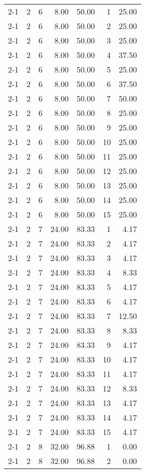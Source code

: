 \begin{tabular}{lrrrrrr}
2-1  & 2 & 6 & 8.00 & 50.00 & 1 & 25.00 \\
2-1  & 2 & 6 & 8.00 & 50.00 & 2 & 25.00 \\
2-1  & 2 & 6 & 8.00 & 50.00 & 3 & 25.00 \\
2-1  & 2 & 6 & 8.00 & 50.00 & 4 & 37.50 \\
2-1  & 2 & 6 & 8.00 & 50.00 & 5 & 25.00 \\
2-1  & 2 & 6 & 8.00 & 50.00 & 6 & 37.50 \\
2-1  & 2 & 6 & 8.00 & 50.00 & 7 & 50.00 \\
2-1  & 2 & 6 & 8.00 & 50.00 & 8 & 25.00 \\
2-1  & 2 & 6 & 8.00 & 50.00 & 9 & 25.00 \\
2-1  & 2 & 6 & 8.00 & 50.00 & 10 & 25.00 \\
2-1  & 2 & 6 & 8.00 & 50.00 & 11 & 25.00 \\
2-1  & 2 & 6 & 8.00 & 50.00 & 12 & 25.00 \\
2-1  & 2 & 6 & 8.00 & 50.00 & 13 & 25.00 \\
2-1  & 2 & 6 & 8.00 & 50.00 & 14 & 25.00 \\
2-1  & 2 & 6 & 8.00 & 50.00 & 15 & 25.00 \\
2-1  & 2 & 7 & 24.00 & 83.33 & 1 & 4.17 \\
2-1  & 2 & 7 & 24.00 & 83.33 & 2 & 4.17 \\
2-1  & 2 & 7 & 24.00 & 83.33 & 3 & 4.17 \\
2-1  & 2 & 7 & 24.00 & 83.33 & 4 & 8.33 \\
2-1  & 2 & 7 & 24.00 & 83.33 & 5 & 4.17 \\
2-1  & 2 & 7 & 24.00 & 83.33 & 6 & 4.17 \\
2-1  & 2 & 7 & 24.00 & 83.33 & 7 & 12.50 \\
2-1  & 2 & 7 & 24.00 & 83.33 & 8 & 8.33 \\
2-1  & 2 & 7 & 24.00 & 83.33 & 9 & 4.17 \\
2-1  & 2 & 7 & 24.00 & 83.33 & 10 & 4.17 \\
2-1  & 2 & 7 & 24.00 & 83.33 & 11 & 4.17 \\
2-1  & 2 & 7 & 24.00 & 83.33 & 12 & 8.33 \\
2-1  & 2 & 7 & 24.00 & 83.33 & 13 & 4.17 \\
2-1  & 2 & 7 & 24.00 & 83.33 & 14 & 4.17 \\
2-1  & 2 & 7 & 24.00 & 83.33 & 15 & 4.17 \\
2-1  & 2 & 8 & 32.00 & 96.88 & 1 & 0.00 \\
2-1  & 2 & 8 & 32.00 & 96.88 & 2 & 0.00 \\

\end{tabular}
